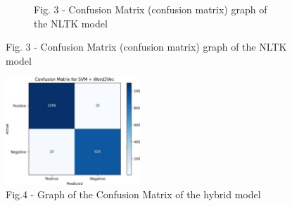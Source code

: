 \begin{figure}[H]
\begin{subfigure}{0.47\textwidth}
        \caption*{Fig. 3 - Confusion Matrix (confusion matrix) graph of the NLTK model}
    \end{subfigure}
\end{figure}

\begin{figure}[H]
	\centering
	\includegraphics[width=0.45\textwidth]{media/ict/image25}
	\caption*{Fig.4 - Graph of the Confusion Matrix of the hybrid model}
\end{figure}

